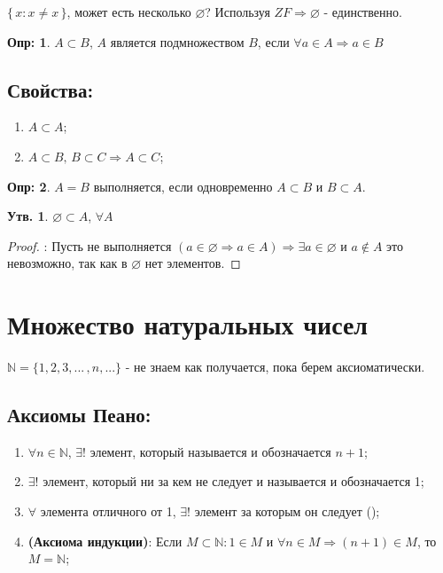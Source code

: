 \documentclass[12pt]{article}
\theoremstyle{definition}
\newtheorem{defn}{Опр:}
\newtheorem{prop}{Утв.}
\begin{document}
$\{\,x \colon x \neq x\,\}$, может есть несколько $\varnothing$? Используя $ZF \Rightarrow \varnothing$ - единственно.

\begin{defn}
	 $A \subset B$, $A$ является подмножеством $B$, если $\forall a \in A \Rightarrow a \in B$
\end{defn}  

\subsection*{Свойства:}
	
	\begin{enumerate}[label={(\arabic*)}]
		\item $A \subset A$;
		\item $A \subset B,\, B \subset C \Rightarrow A \subset C$;
	\end{enumerate}

\begin{defn}
	 $A = B$ выполняется, если одновременно $A \subset B$ и $B \subset A$.
\end{defn}

\begin{prop}
	$\varnothing \subset A$, $\forall A$
	
	\begin{proof}{:}
		Пусть не выполняется $(a \in \varnothing \Rightarrow a \in A) \Rightarrow \exists a \in \varnothing$ и $a \notin A$ это невозможно, так как в $\varnothing$ нет элементов.
	\end{proof}
\end{prop}

\newpage

\section*{Множество натуральных чисел}

$\mathbb{N} = \{1, 2, 3, ... \,, n, ...\}$ - не знаем как получается, пока берем аксиоматически.

\subsection*{Аксиомы Пеано:}
\begin{enumerate}
	\item $\forall n \in \mathbb{N}$, $\exists!$ элемент, который называется  и обозначается $n+1$;
	\item $\exists!$ элемент, который ни за кем не следует и называется  и обозначается 1;
	\item $\forall$ элемента отличного от 1, $\exists!$ элемент за которым он следует ();
	\item \textbf{(Аксиома индукции)}: Если $M \subset \mathbb{N}\colon 1 \in M$ и $\forall n \in M \Rightarrow (n+1) \in M$, то $M = \mathbb{N}$;
\end{enumerate}
\end{document}
